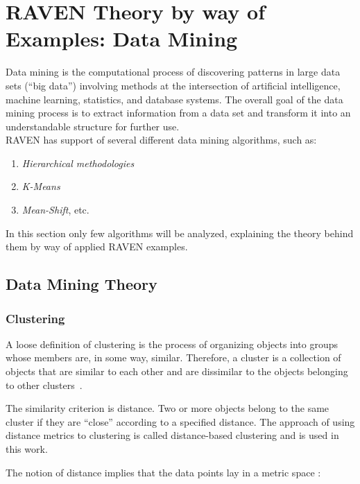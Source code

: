 \section{RAVEN Theory by way of Examples: Data Mining}

Data mining is the computational process of discovering patterns in large data sets (``big data'') involving methods at the intersection of artificial intelligence, machine learning, statistics, and database systems. The overall goal of the data mining process is to extract information from a data set and transform it into an understandable structure for further use. 
\\RAVEN has support of several different data mining algorithms, 
such as:
\begin{enumerate}
  \item \textit{Hierarchical methodologies}
  \item \textit{K-Means}
  \item \textit{Mean-Shift}, etc.
\end{enumerate}
In this section only few algorithms will be analyzed, explaining the theory behind them
by way of applied RAVEN examples.

\subsection{Data Mining Theory}
\label{sec:dataMining}

\subsubsection{Clustering}
\label{clustering}
A loose definition of clustering is the process of organizing objects into groups whose members are, in some way, similar.
Therefore, a cluster is a collection of objects that are similar to each other and are dissimilar to the objects belonging to other clusters~\cite{SurveyClustering,MandelliClusteringRESS}.

The similarity criterion is distance. Two or more objects belong to the same cluster if they are ``close'' according to a specified distance. The approach of using distance metrics to clustering is called distance-based clustering and is used in this work.

The notion of distance implies that the data points lay in a metric space \cite{Mendelson75introduction}:

